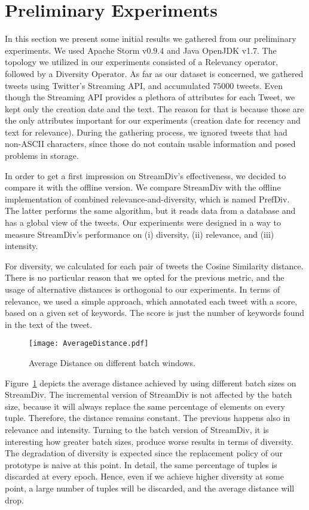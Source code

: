 \section{Preliminary Experiments}

In this section we present some initial results we 
gathered from our preliminary experiments. 
We used Apache Storm v$0.9.4$ and Java 
OpenJDK v1.7. The topology we utilized in our experiments 
consisted of a Relevancy operator, followed by a 
Diversity Operator. 
As far as our dataset is concerned, 
we gathered tweets using Twitter's Streaming API, 
and accumulated $75000$ tweets. 
Even though the Streaming API provides a 
plethora of attributes for each Tweet, we 
kept only the creation date and the text. 
The reason for that is because those are 
the only attributes important for our experiments 
(creation date for recency and text for relevance). 
During the gathering process, we ignored tweets 
that had non-ASCII characters, since those do 
not contain usable information and posed 
problems in storage.

In order to get a first impression on StreamDiv's 
effectiveness, we decided to compare it with the 
offline version. 
We compare StreamDiv with the offline implementation 
of combined relevance-and-diversity, which is named 
PrefDiv. The latter performs the same 
algorithm, but it reads data from a database 
and has a global view of the tweets. 
Our experiments were designed in a way to measure 
StreamDiv's performance on (i) diversity, (ii) relevance, 
and (iii) intensity.

For diversity, we calculated for each pair of tweets 
the Cosine Similarity distance. There is no particular 
reason that we opted for the previous metric, and the 
usage of alternative distances is orthogonal to our 
experiments. In terms of relevance, we used a simple 
approach, which annotated each tweet with a score, 
based on a given set of keywords. 
The score is just the number of 
keywords found in the text of the tweet. 

\begin{figure}[t]
\centering
\texttt{[image: AverageDistance.pdf]}
\caption{Average Distance on different batch windows.}
\label{fig:avg-distance}
\end{figure}

Figure~\ref{fig:avg-distance} depicts the average distance 
achieved by using different batch sizes on StreamDiv. 
The incremental version of StreamDiv is not affected by 
the batch size, because it will always replace the 
same percentage of elements on every tuple. 
Therefore, the distance remains constant. 
The previous happens also in 
relevance and intensity. 
Turning to the batch version of StreamDiv, it is interesting 
how greater batch sizes, produce worse results in terms of diversity. 
The degradation of diversity is expected since the replacement 
policy of our prototype is naive at this point. 
In detail, the same percentage of tuples 
is discarded at every epoch. Hence, even if we achieve 
higher diversity at some point, a large number of tuples 
will be discarded, and the average distance will drop.

